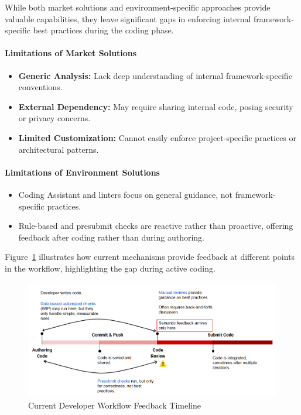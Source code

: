 \begin{spacing}{1.2}
While both market solutions and environment-specific approaches provide valuable capabilities, they leave significant gaps in enforcing internal framework-specific best practices during the coding phase.

\paragraph{Limitations of Market Solutions}

\begin{itemize}
\item \textbf{Generic Analysis:} Lack deep understanding of internal framework-specific conventions.
\item \textbf{External Dependency:} May require sharing internal code, posing security or privacy concerns.
\item \textbf{Limited Customization:} Cannot easily enforce project-specific practices or architectural patterns.
\end{itemize}

\paragraph{Limitations of Environment Solutions}

\begin{itemize}
\item Coding Assistant and linters focus on general guidance, not framework-specific practices.
\item Rule-based and presubmit checks are reactive rather than proactive, offering feedback after coding rather than during authoring.
\end{itemize}

Figure~\ref{fig:developer_workflow_feedback_timeline} illustrates how current mechanisms provide feedback at different points in the workflow, highlighting the gap during active coding.

\begin{figure}[H]
\centering
\includegraphics[scale=0.9]{Images/developer_workflow_feedback_timeline.png}
\caption{Current Developer Workflow Feedback Timeline}
\label{fig:developer_workflow_feedback_timeline}
\end{figure}


\end{spacing}

